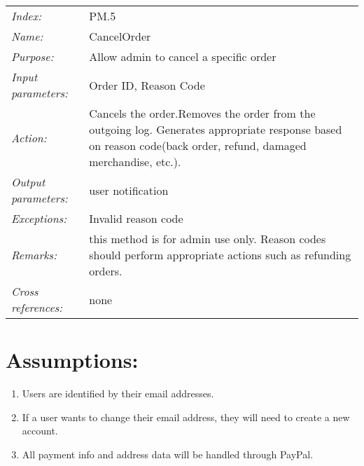 \documentclass[10pt,letter]{article}
\begin{document}
\begin{tabularx}{\textwidth}{l X}

    \it{Index:} & PM.5 \\

    \it{Name:} & CancelOrder \\

    \it{Purpose:} &  Allow admin to cancel a specific order\\

    \it{Input parameters:} &  Order ID, Reason Code\\

    \it{Action:} & Cancels the order.Removes the order from the outgoing log. Generates appropriate response based on reason code(back order, refund, damaged merchandise, etc.).\\

    \it{Output parameters:} & user notification\\

    \it{Exceptions:} & Invalid reason code\\

    \it{Remarks:} & this method is for admin use only. Reason codes should perform appropriate actions such as refunding orders. \\

    \it{Cross references:} & none\\

    \hline

\end{tabularx}

\section{Assumptions:}
\begin{enumerate}
    \item Users are identified by their email addresses.
    \item If a user wants to change their email address, they will need to create a new account.
    \item All payment info and address data will be handled through PayPal.
\end{enumerate}
\end{document}

